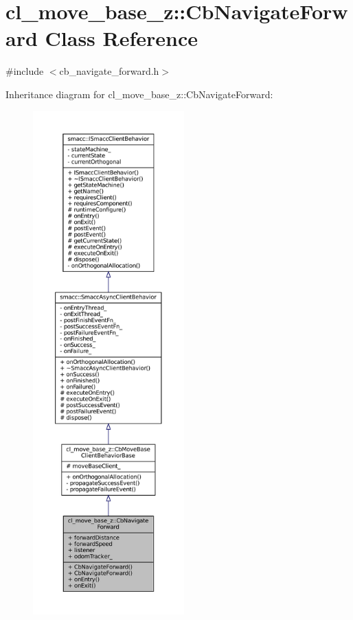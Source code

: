 \hypertarget{classcl__move__base__z_1_1CbNavigateForward}{}\section{cl\+\_\+move\+\_\+base\+\_\+z\+:\+:Cb\+Navigate\+Forward Class Reference}
\label{classcl__move__base__z_1_1CbNavigateForward}


{\ttfamily \#include $<$cb\+\_\+navigate\+\_\+forward.\+h$>$}



Inheritance diagram for cl\+\_\+move\+\_\+base\+\_\+z\+:\+:Cb\+Navigate\+Forward\+:
\nopagebreak
\begin{figure}[H]
\begin{center}
\leavevmode
\includegraphics[height=550pt]{classcl__move__base__z_1_1CbNavigateForward__inherit__graph}
\end{center}
\end{figure}



